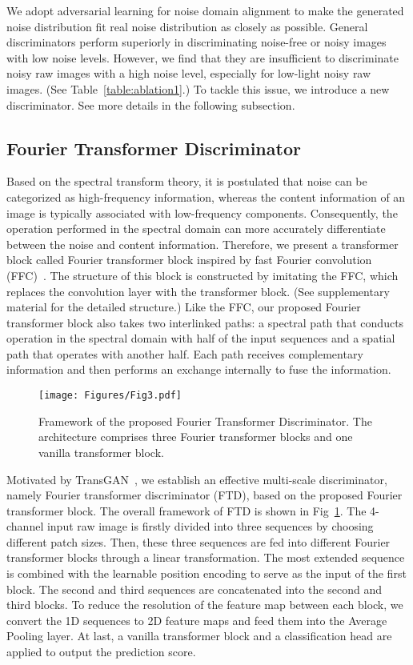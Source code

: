 \documentclass[10pt,twocolumn,letterpaper]{article}
\begin{document}
We adopt adversarial learning for noise domain alignment to make the generated noise distribution fit real noise distribution as closely as possible. General discriminators perform superiorly in discriminating noise-free or noisy images with low noise levels. However, we find that they are insufficient to discriminate noisy raw images with a high noise level, especially for low-light noisy raw images. (See Table~\ref{table:ablation1}.) To tackle this issue, we introduce a new discriminator. See more details in the following subsection.

\subsection{Fourier Transformer Discriminator}
\label{ftd}
Based on the spectral transform theory, it is postulated that noise can be categorized as high-frequency information, whereas the content information of an image is typically associated with low-frequency components. Consequently, the operation performed in the spectral domain can more accurately differentiate between the noise and content information. Therefore, we present a transformer block called Fourier transformer block inspired by fast Fourier convolution (FFC)~\cite{chi2020fast}. The structure of this block is constructed by imitating the FFC, which replaces the convolution layer with the transformer block. (See supplementary material for the detailed structure.) Like the FFC, our proposed Fourier transformer block also takes two interlinked paths: a spectral path that conducts operation in the spectral domain with half of the input sequences and a spatial path that operates with another half. Each path receives complementary information and then performs an exchange internally to fuse the information. 

\begin{figure}[t]
\centering
\texttt{[image: Figures/Fig3.pdf]}
\caption{Framework of the proposed Fourier Transformer Discriminator. The architecture comprises three Fourier transformer blocks and one vanilla transformer block.}
\label{fig:ffcd}
\vspace{-1ex}
\end{figure}

Motivated by TransGAN~\cite{jiang2021transgan}, we establish an effective multi-scale discriminator, namely Fourier transformer discriminator (FTD), based on the proposed Fourier transformer block. The overall framework of FTD is shown in Fig~\ref{fig:ffcd}. The 4-channel input raw image is firstly divided into three sequences by choosing different patch sizes. Then, these three sequences are fed into different Fourier transformer blocks through a linear transformation. The most extended sequence is combined with the learnable position encoding to serve as the input of the first block. The second and third sequences are concatenated into the second and third blocks. To reduce the resolution of the feature map between each block, we convert the 1D sequences to 2D feature maps and feed them into the Average Pooling layer. At last, a vanilla transformer block and a classification head are applied to output the prediction score.
\end{document}
